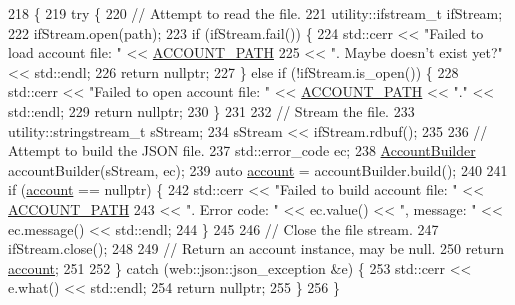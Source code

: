 \begin{DoxyCode}
218 \{
219     \textcolor{keywordflow}{try} \{
220         \textcolor{comment}{// Attempt to read the file.}
221         utility::ifstream\_t ifStream;
222         ifStream.open(path);
223         \textcolor{keywordflow}{if} (ifStream.fail()) \{
224             std::cerr << \textcolor{stringliteral}{"Failed to load account file: "} << \hyperlink{_bee_safe_8cpp_aeadb35b2afa47797b56f17423460fad8}{ACCOUNT\_PATH}
225                       << \textcolor{stringliteral}{". Maybe doesn't exist yet?"} << std::endl;
226             \textcolor{keywordflow}{return} \textcolor{keyword}{nullptr};
227         \} \textcolor{keywordflow}{else} \textcolor{keywordflow}{if} (!ifStream.is\_open()) \{
228             std::cerr << \textcolor{stringliteral}{"Failed to open account file: "} << \hyperlink{_bee_safe_8cpp_aeadb35b2afa47797b56f17423460fad8}{ACCOUNT\_PATH} << \textcolor{stringliteral}{"."} << std::endl;
229             \textcolor{keywordflow}{return} \textcolor{keyword}{nullptr};
230         \}
231 
232         \textcolor{comment}{// Stream the file.}
233         utility::stringstream\_t sStream;
234         sStream << ifStream.rdbuf();
235 
236         \textcolor{comment}{// Attempt to build the JSON file.}
237         std::error\_code ec;
238         \hyperlink{class_account_builder}{AccountBuilder} accountBuilder(sStream, ec);
239         \textcolor{keyword}{auto} \hyperlink{class_bee_safe_manager_a52bc9bc8c1ea9608b83d603b142443b0}{account} = accountBuilder.build();
240 
241         \textcolor{keywordflow}{if} (\hyperlink{class_bee_safe_manager_a52bc9bc8c1ea9608b83d603b142443b0}{account} == \textcolor{keyword}{nullptr}) \{
242             std::cerr << \textcolor{stringliteral}{"Failed to build account file: "} << \hyperlink{_bee_safe_8cpp_aeadb35b2afa47797b56f17423460fad8}{ACCOUNT\_PATH}
243                       << \textcolor{stringliteral}{". Error code: "} << ec.value() << \textcolor{stringliteral}{", message: "} << ec.message() << std::endl;
244         \}
245 
246         \textcolor{comment}{// Close the file stream.}
247         ifStream.close();
248 
249         \textcolor{comment}{// Return an account instance, may be null.}
250         \textcolor{keywordflow}{return} \hyperlink{class_bee_safe_manager_a52bc9bc8c1ea9608b83d603b142443b0}{account};
251 
252     \} \textcolor{keywordflow}{catch} (web::json::json\_exception &e) \{
253         std::cerr << e.what() << std::endl;
254         \textcolor{keywordflow}{return} \textcolor{keyword}{nullptr};
255     \}
256 \}
\end{DoxyCode}
